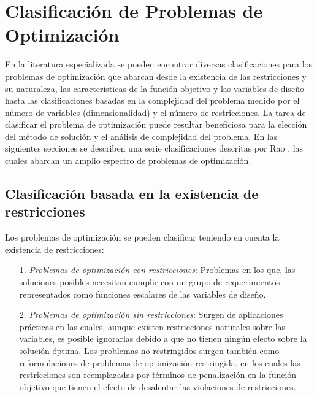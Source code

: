 \section{Clasificación de Problemas de Optimización}\label{sec:Clasificación de Problemas de Optimización}
En la literatura especializada se pueden encontrar diversas clasificaciones para los problemas de optimización que abarcan desde la existencia de las restricciones y su naturaleza, las características de la función objetivo y las variables de diseño hasta las clasificaciones basadas en la complejidad del problema medido por el número de variables (dimensionalidad) y el número de restricciones\cite{luenberger_linear_2015}. La tarea de clasificar el problema de optimización puede resultar beneficiosa para la elección del método de solución y el análisis de complejidad del problema. En las siguientes secciones se describen una serie clasificaciones descritas por Rao \cite{rao_engineering_2009}, las cuales abarcan un amplio espectro de problemas de optimización.

\subsection{Clasificación basada en la existencia de restricciones}
Los problemas de optimización se pueden clasificar teniendo en cuenta la existencia de restricciones:
\begin{itemize}
\item [1.]  \textit{Problemas de optimización con restricciones}: Problemas en los que, las soluciones posibles necesitan cumplir con un grupo de requerimientos representados como funciones escalares de las variables de diseño.
\item [2.]  \textit{Problemas de optimización sin restricciones}: Surgen de aplicaciones prácticas en las cuales, aunque existen restricciones naturales sobre las variables, es posible ignorarlas debido a que no tienen ningún efecto sobre la solución óptima. Los problemas no restringidos surgen también como reformulaciones de problemas de optimización restringida, en los cuales las restricciones son reemplazadas por términos de penalización en la función objetivo que tienen el efecto de desalentar las violaciones de restricciones.
\end{itemize}

